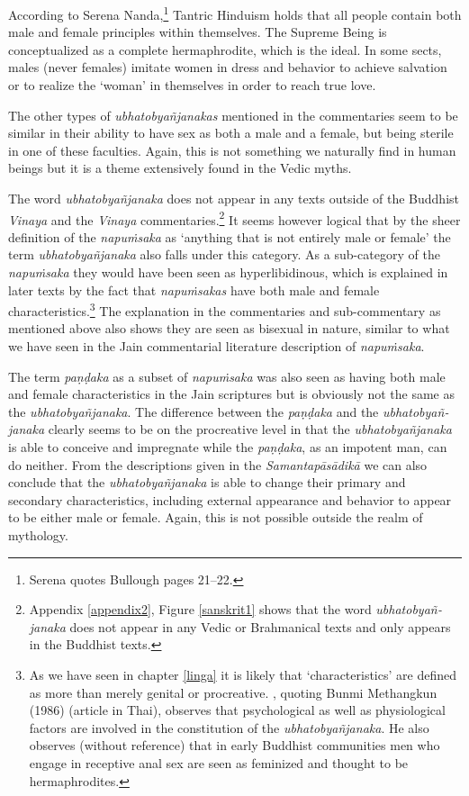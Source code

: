According to Serena Nanda,\footnote{Serena \cite{nanda} quotes Bullough pages 21–22.} Tantric Hinduism holds that all people contain both male and female principles within themselves. The Supreme Being is conceptualized as a complete hermaphrodite, which is the ideal. In some sects, males (never females) imitate women in dress and behavior to achieve salvation or to realize the `woman' in themselves in order to reach true love.

The other types of \textit{ubhatob­yañ­janakas} mentioned in the commentaries seem to be similar in their ability to have sex as both a male and a female, but being sterile in one of these faculties. Again, this is not something we naturally find in human beings but it is a theme extensively found in the Vedic myths.

The word \textit{ubhatob­yañ­janaka} does not appear in any texts outside of the Buddhist \textit{Vinaya} and the \textit{Vinaya} commentaries.\footnote{Appendix \ref{appendix2}, Figure \ref{sanskrit1} shows that the word \textit{ubhatob­yañ­janaka} does not appear in any Vedic or Brahmanical texts and only appears in the Buddhist texts.} It seems however logical that by the sheer definition of the \textit{napuṁsaka} as `anything that is not entirely male or female' the term \textit{ubhatob­yañ­janaka} also falls under this category. As a sub-category of the \textit{napuṁsaka} they would have been seen as hyperlibidinous, which is explained in later texts by the fact that \textit{napuṁsakas} have both male and female characteristics.\footnote{As we have seen in chapter \ref{linga} it is likely that `characteristics' are defined as more than merely genital or procreative. \cite{jackson}, quoting Bunmi Methangkun (1986) (article in Thai), observes that psychological as well as physiological factors are involved in the constitution of the \textit{ubhatob­yañ­janaka}. He also observes (without reference) that in early Buddhist communities men who engage in receptive anal sex are seen as feminized and thought to be hermaphrodites.} The explanation in the commentaries and sub-commentary as mentioned above also shows they are seen as bisexual in nature, similar to what we have seen in the Jain commentarial literature description of \textit{napuṁsaka}.

The term \textit{paṇḍaka} as a subset of \textit{napuṁsaka} was also seen as having both male and female characteristics in the Jain scriptures but is obviously not the same as the \textit{ubhatob­yañ­janaka}. The difference between the \textit{paṇḍaka} and the \textit{ubhatob­yañ­janaka} clearly seems to be on the procreative level in that the \textit{ubhatob­yañ­janaka} is able to conceive and impregnate while the \textit{paṇḍaka}, as an impotent man, can do neither. From the descriptions given in the \textit{Samantapāsādikā} we can also conclude that the \textit{ubhatob­yañ­janaka} is able to change their primary and secondary characteristics, including external appearance and behavior to appear to be either male or female. Again, this is not possible outside the realm of mythology.

